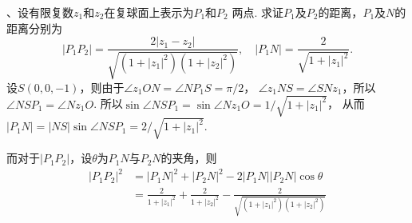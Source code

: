 \vspace{1cm}
\par{}、设有限复数$z_1$和$z_2$在复球面上表示为$P_1$和$P_2$
  两点. 求证$P_1$及$P_2$的距离，$P_1$及$N$的距离分别为
  \[
    |P_1P_2| = \frac{2|z_1-z_2|}{\sqrt{(1+|z_1|^2)(1+|z_2|^2)}},\quad
    |P_1N| = \frac{2}{\sqrt{1+|z_1|^2}}.
  \]
\proof
  设$S(0, 0, -1)$，则由于$\angle z_1ON = \angle NP_1S = \pi / 2$，
  $\angle z_1NS = \angle SNz_1$，所以$\angle NSP_1 = \angle Nz_1O$.
  所以$\sin\angle NSP_1 = \sin\angle Nz_1O = 1/\sqrt{1+|z_1|^2}$，
  从而$|P_1N| = |NS|\sin\angle NSP_1 = 2 / \sqrt{1+|z_1|^2}$.\par
  而对于$|P_1P_2|$，设$\theta$为$P_1N$与$P_2N$的夹角，则
  \[\begin{split}
    |P_1P_2|^2 &= |P_1N|^2 + |P_2N|^2 - 2|P_1N||P_2N|\cos\theta \\
     &= \frac{2}{1+|z_1|^2} + \frac{2}{1+|z_2|^2} -
        \frac{2}{\sqrt{(1+|z_1|^2)(1+|z_2|^2)}}
  \end{split}\]



